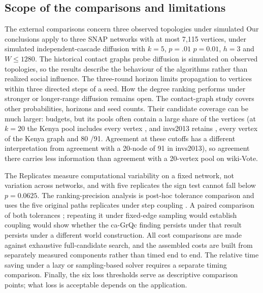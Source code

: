 \documentclass[smallextended]{svjour3}
\providecommand{\DIFaddtex}[1]{{\protect\color{blue} \sf #1}} %
\providecommand{\DIFdeltex}[1]{{\protect\color{red} \scriptsize #1}} %
\providecommand{\DIFaddbegin}{} %
\providecommand{\DIFaddend}{} %
\providecommand{\DIFdelbegin}{} %
\providecommand{\DIFdelend}{} %
\providecommand{\DIFadd}[1]{\texorpdfstring{\DIFaddtex{#1}}{#1}} %
\providecommand{\DIFdel}[1]{\texorpdfstring{\DIFdeltex{#1}}{}} %
\providecommand{\DIFscaledelfig}{0.5}
\newlength{\DIFdelgraphicswidth} %
\newlength{\DIFdelgraphicsheight} %
\providecommand{\DIFaddincludegraphics}[2][]{{\color{blue}\fbox{\DIFOincludegraphics[#1]{#2}}}} %
\providecommand{\DIFdelincludegraphics}[2][]{%
\sbox{\DIFdelgraphicsbox}{\DIFOincludegraphics[#1]{#2}}%
\settoboxwidth{\DIFdelgraphicswidth}{\DIFdelgraphicsbox} %
\settoboxtotalheight{\DIFdelgraphicsheight}{\DIFdelgraphicsbox} %
\scalebox{\DIFscaledelfig}{%
\parbox[b]{\DIFdelgraphicswidth}{\usebox{\DIFdelgraphicsbox}\\[-\baselineskip] \rule{\DIFdelgraphicswidth}{0em}}\llap{\resizebox{\DIFdelgraphicswidth}{\DIFdelgraphicsheight}{%
\setlength{\unitlength}{\DIFdelgraphicswidth}%
\begin{picture}(1,1)%
\thicklines\linethickness{2pt} %
{\color[rgb]{1,0,0}\put(0,0){\framebox(1,1){}}}%
{\color[rgb]{1,0,0}\put(0,0){\line( 1,1){1}}}%
{\color[rgb]{1,0,0}\put(0,1){\line(1,-1){1}}}%
\end{picture}%
}\hspace*{3pt}}} %
} %
\DeclareRobustCommand{\DIFaddbegin}{\DIFOaddbegin \let\includegraphics\DIFaddincludegraphics} %
\DeclareRobustCommand{\DIFaddend}{\DIFOaddend \let\includegraphics\DIFOincludegraphics} %
\DeclareRobustCommand{\DIFdelbegin}{\DIFOdelbegin \let\includegraphics\DIFdelincludegraphics} %
\DeclareRobustCommand{\DIFdelend}{\DIFOaddend \let\includegraphics\DIFOincludegraphics} %
\begin{document}
\subsection{Scope \DIFdelbegin \DIFdel{of the comparisons}\DIFdelend \DIFaddbegin \DIFadd{and limitations}\DIFaddend }
\DIFdelbegin \DIFdel{The external comparisons concern three observed topologies under simulated }\DIFdelend \DIFaddbegin \DIFadd{Our conclusions apply to three SNAP networks with at most 7,115 vertices, under simulated independent-cascade }\DIFaddend diffusion with $k=5$, \DIFdelbegin \DIFdel{$p=.01$}\DIFdelend \DIFaddbegin \DIFadd{$p=0.01$}\DIFaddend , $h=3$ and $W\le1280$. The \DIFdelbegin \DIFdel{historical contact graphs probe }\DIFdelend \DIFaddbegin \DIFadd{diffusion is simulated on observed topologies, so the results describe the behaviour of the algorithms rather than realized social influence. The three-round horizon limits propagation to vertices within three directed steps of a seed. How the degree ranking performs under stronger or longer-range diffusion remains open. The contact-graph study covers }\DIFaddend other probabilities, horizons and seed \DIFdelbegin \DIFdel{counts. Their candidate coverage can be much larger: }\DIFdelend \DIFaddbegin \DIFadd{budgets, but its pools often contain a large share of the vertices (}\DIFaddend at $k=20$\DIFdelbegin \DIFdel{the Kenya pool includes every vertex , and invs2013 retains }\DIFdelend \DIFaddbegin \DIFadd{, every vertex of the Kenya graph and }\DIFaddend 80 \DIFdelbegin \DIFdel{/91. Agreement at these cutoffs has a different interpretation from agreement with a 20-node }\DIFdelend \DIFaddbegin \DIFadd{of 91 in invs2013), so agreement there carries less information than agreement with a 20-vertex }\DIFaddend pool on wiki-Vote.

\DIFdelbegin \DIFdel{The }\DIFdelend \DIFaddbegin \DIFadd{Replicates measure computational variability on a fixed network, not variation across networks, and with five replicates the sign test cannot fall below $p=0.0625$. The ranking-precision analysis is }\DIFaddend post-hoc \DIFdelbegin \DIFdel{tolerance comparison }\DIFdelend \DIFaddbegin \DIFadd{and }\DIFaddend uses the five original \DIFdelbegin \DIFdel{paths }\DIFdelend \DIFaddbegin \DIFadd{replicates }\DIFaddend under step coupling\DIFdelbegin \DIFdel{. A paired comparison of both tolerances }\DIFdelend \DIFaddbegin \DIFadd{; repeating it }\DIFaddend under fixed-edge \DIFdelbegin \DIFdel{sampling would establish }\DIFdelend \DIFaddbegin \DIFadd{coupling would show }\DIFaddend whether the ca-GrQc \DIFdelbegin \DIFdel{finding persists under that }\DIFdelend \DIFaddbegin \DIFadd{result persists under a different }\DIFaddend world construction. \DIFaddbegin \DIFadd{All cost comparisons are made against exhaustive full-candidate search, and the assembled costs are built from separately measured components rather than timed end to end. The relative time saving under a lazy or sampling-based solver requires a separate timing comparison. Finally, the six loss thresholds serve as descriptive comparison points; what loss is acceptable depends on the application.
}\DIFaddend 
\end{document}
